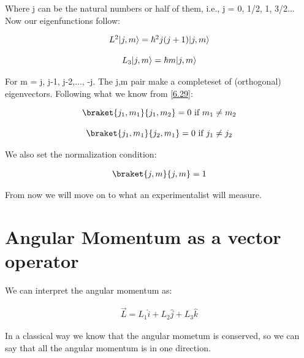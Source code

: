 Where j can be the natural numbers or half of them, i.e., j = 0, 1/2, 1, 3/2... Now our eigenfunctions follow:

\begin{equation}
  \begin{array}{c}
    L^2 \lvert j,m\rangle = \hbar^2 j(j+1) \lvert j,m\rangle
    \\

    \\
    L_3 \lvert j,m\rangle = \hbar m \lvert j,m\rangle
  \end{array}
\end{equation}

For m = j, j-1, j-2,..., -j. The j,m pair make a completeset of (orthogonal) eigenvectors. Following what we know from \ref{6.29}:

\begin{equation}
  \begin{array}{c}
    \braket{j_1,m_1}{j_1,m_2} = 0 \text{ if } m_1 \neq m_2
    \\

    \\
    \braket{j_1,m_1}{j_2,m_1} = 0 \text{ if } j_1 \neq j_2
  \end{array}
\end{equation}

We also set the normalization condition:

\begin{equation}
  \begin{array}{c}
    \braket{j,m}{j,m} = 1
  \end{array}
\end{equation}

From now we will move on to what an experimentalist will measure.

\section{Angular Momentum as a vector operator}

We can interpret the angular momentum as:

\begin{equation}
  \begin{array}{c}
    \vec{L} = L_1 \hat{i} + L_2 \hat{j} + L_3 \hat{k}
  \end{array}
\end{equation}

In a classical way we know that the angular mometum is conserved, so we can say that all the angular momentum is in one direction.

